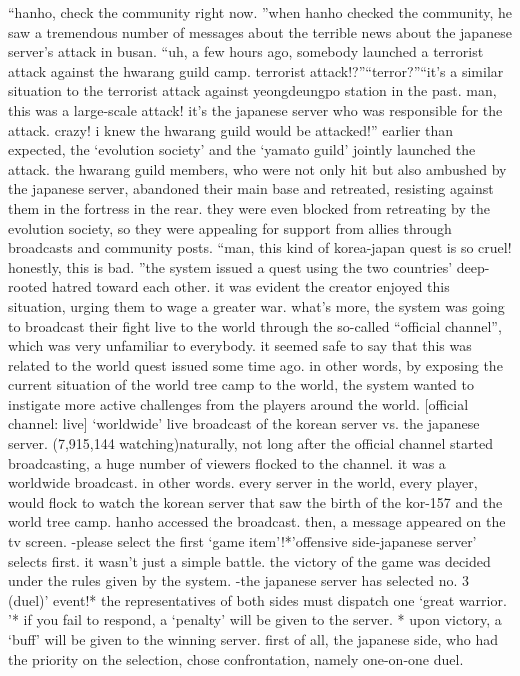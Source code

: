 “hanho, check the community right now.
”when hanho checked the community, he saw a tremendous number of messages about the terrible news about the japanese server’s attack in busan.
“uh, a few hours ago, somebody launched a terrorist attack against the hwarang guild camp.
 terrorist attack!?”“terror?”“it’s a similar situation to the terrorist attack against yeongdeungpo station in the past.
 man, this was a large-scale attack! it’s the japanese server who was responsible for the attack.
 crazy! i knew the hwarang guild would be attacked!”
earlier than expected, the ‘evolution society’ and the ‘yamato guild’ jointly launched the attack.
the hwarang guild members, who were not only hit but also ambushed by the japanese server, abandoned their main base and retreated, resisting against them in the fortress in the rear.
they were even blocked from retreating by the evolution society, so they were appealing for support from allies through broadcasts and community posts.
“man, this kind of korea-japan quest is so cruel! honestly, this is bad.
”the system issued a quest using the two countries’ deep-rooted hatred toward each other.
 it was evident the creator enjoyed this situation, urging them to wage a greater war.
what’s more, the system was going to broadcast their fight live to the world through the so-called “official channel”, which was very unfamiliar to everybody.
it seemed safe to say that this was related to the world quest issued some time ago.
 in other words, by exposing the current situation of the world tree camp to the world, the system wanted to instigate more active challenges from the players around the world.
[official channel: live] ‘worldwide’ live broadcast of the korean server vs.
 the japanese server.
(7,915,144 watching)naturally, not long after the official channel started broadcasting, a huge number of viewers flocked to the channel.
 it was a worldwide broadcast.
 in other words.
 every server in the world, every player, would flock to watch the korean server that saw the birth of the kor-157 and the world tree camp.
hanho accessed the broadcast.
 then, a message appeared on the tv screen.
-please select the first ‘game item’!*’offensive side-japanese server’ selects first.
it wasn’t just a simple battle.
 the victory of the game was decided under the rules given by the system.
-the japanese server has selected no.
 3 (duel)’ event!* the representatives of both sides must dispatch one ‘great warrior.
’* if you fail to respond, a ‘penalty’ will be given to the server.
* upon victory, a ‘buff’ will be given to the winning server.
first of all, the japanese side, who had the priority on the selection, chose confrontation, namely one-on-one duel.
